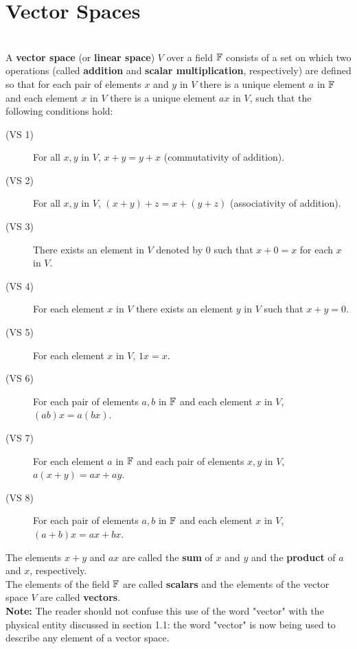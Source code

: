 \section{Vector Spaces}

\begin{definition}
	\hfill\\
	A \textbf{vector space} (or \textbf{linear space}) $V$ over a field $\mathbb{F}$ consists of a set on which two operations (called \textbf{addition} and \textbf{scalar multiplication}, respectively) are defined so that for each pair of elements $x$ and $y$ in $V$ there is a unique element $a$ in $\mathbb{F}$ and each element $x$ in $V$ there is a unique element $ax$ in $V$, such that the following conditions hold:

	\begin{description}
		\item[(VS 1)] For all $x, y$ in $V$, $x + y = y + x$ (commutativity of addition).
		\item[(VS 2)] For all $x, y$ in $V$, $(x + y) + z = x + (y + z)$ (associativity of addition).
		\item[(VS 3)] There exists an element in $V$ denoted by $0$ such that $x + 0 = x$ for each $x$ in $V$.
		\item[(VS 4)] For each element $x$ in $V$ there exists an element $y$ in $V$ such that $x + y = 0$.
		\item[(VS 5)] For each element $x$ in $V$, $1x=x$.
		\item[(VS 6)] For each pair of elements $a, b$ in $\mathbb{F}$ and each element $x$ in $V$, $(ab)x = a(bx)$.
		\item[(VS 7)] For each element $a$ in $\mathbb{F}$ and each pair of elements $x, y$ in $V$, $a(x + y) = ax + ay$.
		\item[(VS 8)] For each pair of elements $a, b$ in $\mathbb{F}$ and each element $x$ in $V$, $(a + b)x = ax + bx$.
	\end{description}

	The elements $x + y$ and $ax$ are called the \textbf{sum} of $x$ and $y$ and the \textbf{product} of $a$ and $x$, respectively.\\

	The elements of the field $\mathbb{F}$ are called \textbf{scalars} and the elements of the vector space $V$ are called \textbf{vectors}.\\

	\textbf{Note:} The reader should not confuse this use of the word "vector" with the physical entity discussed in section 1.1: the word "vector" is now being used to describe any element of a vector space.
\end{definition}

